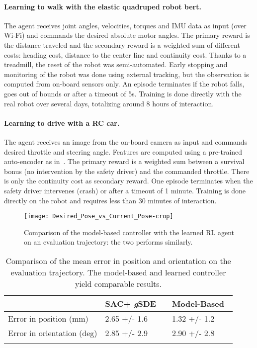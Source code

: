 \documentclass{article}
\newcommand{\ourSDE}{\textit{g}\textsc{SDE}\xspace}
\newcommand{\sac}{\textsc{SAC}\xspace}
\begin{document}
\paragraph{Learning to walk with the elastic quadruped robot bert.}
The agent receives joint angles, velocities, torques and IMU data as input (over Wi-Fi) and commands the desired absolute motor angles.
The primary reward is the distance traveled and the secondary reward is a weighted sum of different costs: heading cost, distance to the center line and continuity cost.
Thanks to a treadmill, the reset of the robot was semi-automated.
Early stopping and monitoring of the robot was done using external tracking, but the observation is computed from on-board sensors only.
An episode terminates if the robot falls, goes out of bounds or after a timeout of 5s.
Training is done directly with the real robot over several days, totalizing around 8 hours of interaction.


\paragraph{Learning to drive with a RC car.}
The agent receives an image from the on-board camera as input and commands desired throttle and steering angle.
Features are computed using a pre-trained auto-encoder as in~\citet{drive-smoothly-in-minutes}.
The primary reward is a weighted sum between a survival bonus (no intervention by the safety driver) and the commanded throttle.
There is only the continuity cost as secondary reward.
One episode terminates when the safety driver intervenes (crash) or after a timeout of 1 minute.
Training is done directly on the robot and requires less than 30 minutes of interaction.


\begin{figure}[h!]
  \centering\texttt{[image: Desired\_Pose\_vs\_Current\_Pose-crop]}
  \label{fig:eval-traj-big}
  \caption{Comparison of the model-based controller with the learned RL agent on an evaluation trajectory: the two performs similarly.}
\end{figure}

\begin{table}[h!]
\renewcommand{\arraystretch}{1.2}
\centering
\begin{tabular}{@{}l l c l@{}}

\toprule
& \sac + \ourSDE & \phantom{abc} & Model-Based~\citep{deutschmann2017position}\\
  \midrule
 Error in position (mm) & 2.65 +/- 1.6 & & 1.32 +/- 1.2 \\
 Error in orientation (deg) & 2.85 +/- 2.9 & & 2.90 +/- 2.8 \\
\bottomrule \\
\end{tabular}

\caption{Comparison of the mean error in position and orientation on the evaluation trajectory. The model-based and learned controller yield comparable results.}
\label{tab:res-eval-traj}
\end{table}
\end{document}
